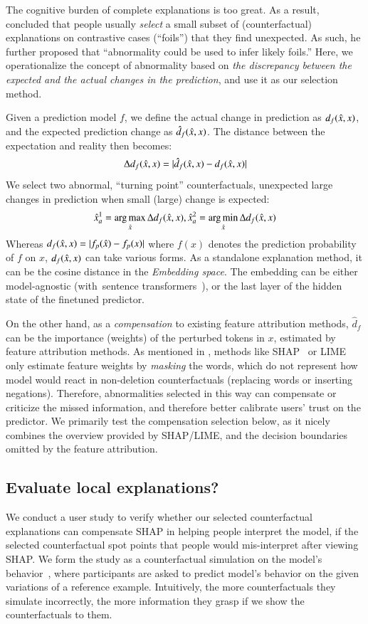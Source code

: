 The cognitive burden of complete explanations is too great.
As a result, \citet{miller} concluded that people usually \emph{select} a small subset of (counterfactual) explanations on contrastive cases (``foils'') that they find unexpected. 
As such, he further proposed that ``abnormality could be used to infer likely foils.''
Here, we operationalize the concept of abnormality based on \emph{the discrepancy between the expected and the actual changes in the prediction}, and use it as our selection method.

Given a prediction model $f$, we define the actual change in prediction as $d_f(\hat{x}, x)$, and the expected prediction change as $\hat{d}_f(\hat{x}, x)$.
The distance between the expectation and reality then becomes:
$$\Delta d_f(\hat{x}, x) = |\hat{d}_f(\hat{x}, x)-d_f(\hat{x}, x)|$$
We select two abnormal, ``turning point'' counterfactuals, \ie unexpected large changes in prediction when small (large) change is expected:
$$ \hat{x}_a^1 = \operatorname*{arg\,max}_{\hat{x}} \Delta d_f(\hat{x}, x), \hat{x}_a^2 = \operatorname*{arg\,min}_{\hat{x}} \Delta d_f(\hat{x}, x)$$
Whereas $d_f(\hat{x}, x)=|f_p(\hat{x})-f_p(x)|$ where $f(x)$ denotes the prediction probability of $f$ on $x$, $d_f(\hat{x}, x)$ can take various forms. 
As a standalone explanation method, it can be the cosine distance in the \emph{Embedding space}.
The embedding can be either model-agnostic (\eg with~sentence transformers~\cite{reimers-2019-sentence-bert}), or the last layer of the hidden state of the finetuned predictor.

On the other hand, as a \emph{compensation} to existing feature attribution methods, $\hat{d}_f$ can be the importance (weights) of the perturbed tokens in $x$, estimated by feature attribution methods.
As mentioned in \wts{\S\ref{}}, methods like SHAP~\cite{} or LIME~\cite{} only estimate feature weights by \emph{masking} the words, which do not represent how model would react in non-deletion counterfactuals (replacing words or inserting negations).
Therefore, abnormalities selected in this way can  compensate or criticize the missed information, and therefore better calibrate users' trust on the predictor.
We primarily test the compensation selection below, as it nicely combines the overview provided by SHAP/LIME, and the decision boundaries omitted by the feature attribution. 



\subsection{Evaluate local explanations?}
We conduct a user study to verify whether our selected counterfactual explanations can compensate SHAP in helping people interpret the model, \ie if the selected counterfactual spot points that people would mis-interpret after viewing SHAP.
We form the study as a counterfactual simulation on the model's behavior~\cite{hase2020evaluating}, where participants are asked to predict model's behavior on the given variations of a reference example.
Intuitively, the more counterfactuals they simulate incorrectly, the more information they grasp if we show the counterfactuals to them.

